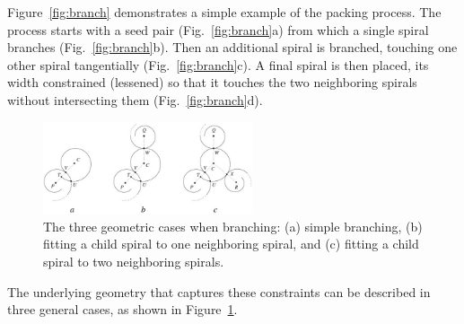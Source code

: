 \documentclass[11pt]{IEEEtran}
\begin{document}
Figure~\ref{fig:branch} demonstrates a simple example of the packing process. The process starts with a seed pair (Fig.~\ref{fig:branch}a) from which a single spiral branches (Fig.~\ref{fig:branch}b). Then an additional spiral is branched, touching one other spiral tangentially (Fig.~\ref{fig:branch}c). A final spiral is then placed, its width constrained (lessened) so that it touches the two neighboring spirals without intersecting them (Fig.~\ref{fig:branch}d).

\begin{figure}[t]
\centering \includegraphics[width=0.55\textwidth]{spiral-packing-fig-01}
\caption{The three geometric cases when branching: (a) simple branching, (b) fitting a child spiral to one neighboring spiral, and (c) fitting a child spiral to two neighboring spirals. \cite{Browne2006834}}
\label{fig:geo}
\end{figure}

The underlying geometry that captures these constraints can be described in three general cases, as shown in Figure~\ref{fig:geo}. 
\end{document}
